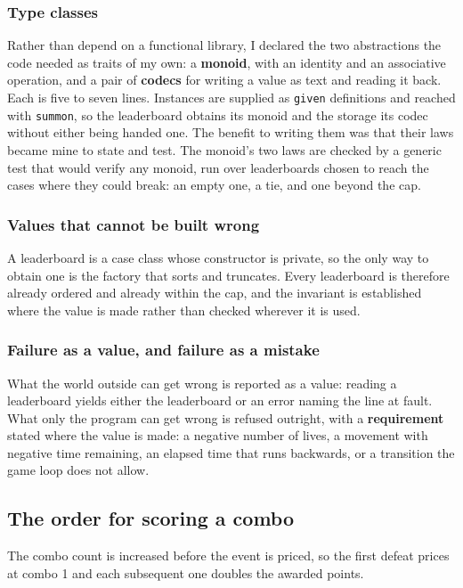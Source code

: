 \subsubsection{Type classes}

Rather than depend on a functional library, I declared the two abstractions the code needed as traits of my own:
a \textbf{monoid}, with an identity and an associative operation, and a pair of \textbf{codecs} for writing a
value as text and reading it back. Each is five to seven lines. Instances are supplied as \texttt{given} definitions
and reached with \texttt{summon}, so the leaderboard obtains its monoid and the storage its codec without either
being handed one. The benefit to writing them was that their laws became mine to state and test. The monoid's two
laws are checked by a generic test that would verify any monoid, run over leaderboards chosen to reach the cases where
they could break: an empty one, a tie, and one beyond the cap.

\subsubsection{Values that cannot be built wrong}

A leaderboard is a case class whose constructor is private, so the only way to obtain one is the factory that sorts
and truncates. Every leaderboard is therefore already ordered and already within the cap, and the invariant is
established where the value is made rather than checked wherever it is used.

\subsubsection{Failure as a value, and failure as a mistake}

What the world outside can get wrong is reported as a value: reading a leaderboard yields either the leaderboard or
an error naming the line at fault. What only the program can get wrong is refused outright, with a \textbf{requirement}
stated where the value is made: a negative number of lives, a movement with negative time remaining, an elapsed time
that runs backwards, or a transition the game loop does not allow.

\subsection{The order for scoring a combo}

The combo count is increased before the event is priced, so the first defeat prices at combo 1 and each subsequent
one doubles the awarded points.

